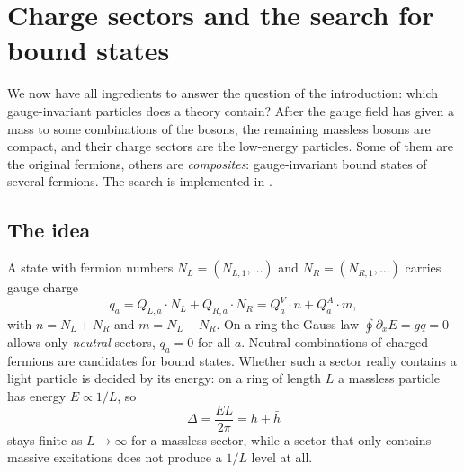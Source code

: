 \chapter{Charge sectors and the search for bound states}\label{chap:bound}

We now have all ingredients to answer the question of the introduction: which gauge-invariant particles does a
theory contain? After the gauge field has given a mass to some combinations of the bosons, the remaining
massless bosons are compact, and their charge sectors are the low-energy particles. Some of them are the original
fermions, others are \emph{composites}: gauge-invariant bound states of several fermions. The search is
implemented in .

\section{The idea}
A state with fermion numbers $N_L = (N_{L,1},\dots)$ and $N_R = (N_{R,1},\dots)$ carries gauge charge
\begin{equation}
  q_a = Q_{L,a}\cdot N_L + Q_{R,a}\cdot N_R = Q^V_a\cdot n + Q^A_a\cdot m ,
\end{equation}
with $n = N_L + N_R$ and $m = N_L - N_R$. On a ring the Gauss law $\oint\partial_xE = gq = 0$ allows only
\emph{neutral} sectors, $q_a = 0$ for all $a$. Neutral combinations of charged fermions are candidates for bound
states. Whether such a sector really contains a light particle is decided by its energy: on a ring of length $L$
a massless particle has energy $E\propto1/L$, so
\begin{equation}
  \Delta = \frac{EL}{2\pi} = h + \bar h
\end{equation}
stays finite as $L\to\infty$ for a massless sector, while a sector that only contains massive excitations does not
produce a $1/L$ level at all.


